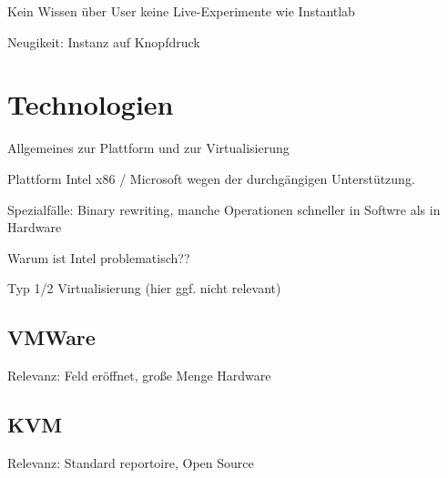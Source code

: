 		Kein Wissen über User
		keine Live-Experimente wie Instantlab
		
		Neugikeit: Instanz auf Knopfdruck
		
\section{Technologien}
\label{sec:technologies}

		Allgemeines zur Plattform und zur Virtualisierung

		Plattform Intel x86 / Microsoft wegen der durchgängigen Unterstützung. \cite{PopekGoldberg}

		Spezialfälle: Binary rewriting, manche Operationen schneller in Softwre als in Hardware

		Warum ist Intel problematisch??

		Typ 1/2 Virtualisierung (hier ggf. nicht relevant)


		\subsection{VMWare}

		Relevanz: Feld eröffnet, große Menge Hardware

		\subsection{KVM}

		Relevanz: Standard reportoire, Open Source

		